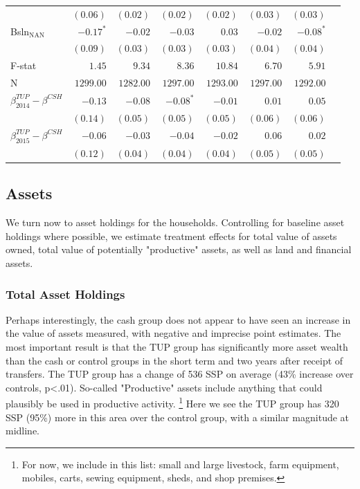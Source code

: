 \documentclass[12pt,article]{article}
\begin{document}
\begin{longtable}{lrrrrrrr}
 & \(( 0.06)\) & \(( 0.02)\) & \(( 0.02)\) & \(( 0.02)\) & \(( 0.03)\) & \(( 0.03)\)\\
Bsln\(_{\text{NAN}}\) & \(-0.17^{*}\) & \(-0.02\) & \(-0.03\) & \(0.03\) & \(-0.02\) & \(-0.08^{*}\)\\
 & \(( 0.09)\) & \(( 0.03)\) & \(( 0.03)\) & \(( 0.03)\) & \(( 0.04)\) & \(( 0.04)\)\\
\hline
F-stat & \(1.45\) & \(9.34\) & \(8.36\) & \(10.84\) & \(6.70\) & \(5.91\)\\
N & \(1299.00\) & \(1282.00\) & \(1297.00\) & \(1293.00\) & \(1297.00\) & \(1292.00\)\\
\hline
\(\beta^{TUP}_{2014}-\beta^{CSH}\) & \(-0.13\) & \(-0.08\) & \(-0.08^{*}\) & \(-0.01\) & \(0.01\) & \(0.05\)\\
 & \(( 0.14)\) & \(( 0.05)\) & \(( 0.05)\) & \(( 0.05)\) & \(( 0.06)\) & \(( 0.06)\)\\
\(\beta^{TUP}_{2015}-\beta^{CSH}\) & \(-0.06\) & \(-0.03\) & \(-0.04\) & \(-0.02\) & \(0.06\) & \(0.02\)\\
 & \(( 0.12)\) & \(( 0.04)\) & \(( 0.04)\) & \(( 0.04)\) & \(( 0.05)\) & \(( 0.05)\)\\
\hline
\end{longtable}

\subsection{Assets}
\label{sec:orgheadline13}

We turn now to asset holdings for the households. Controlling for baseline asset holdings
where possible, we estimate treatment effects for total value of assets owned, total
value of potentially "productive" assets, as well as land and financial assets. 

\subsubsection{Total Asset Holdings}
\label{sec:orgheadline10}

Perhaps interestingly, the cash group does not appear to have seen an increase in the
value of assets measured, with negative and imprecise point estimates. The most
important result is that the TUP group has significantly more asset wealth than the
cash or control groups in the short term and two years after receipt of transfers.
The TUP group has a change of 536 SSP on average (43\% increase over controls, p<.01).
So-called "Productive" assets include anything that could plausibly be used in
productive activity. \footnote{For now, we include in this list: small and large
livestock, farm equipment, mobiles, carts, sewing equipment, sheds, and shop
premises.} Here we see the TUP group has 320 SSP (95\%) more in this area over the
control group, with a similar magnitude at midline.
\end{document}

